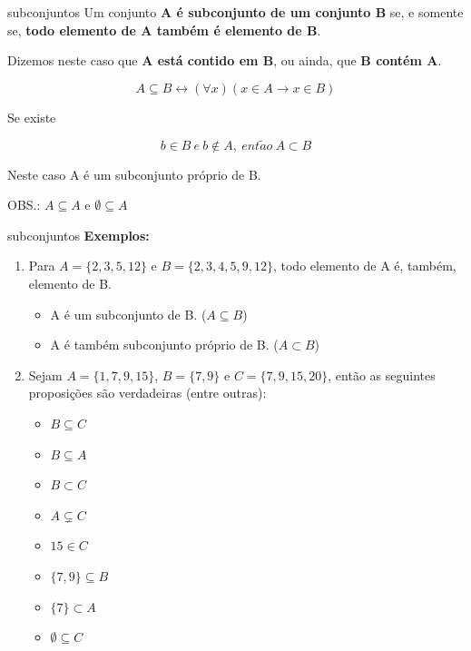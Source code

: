 \documentclass[aspectratio=169]{beamer}
\begin{document}
\begin{frame}{subconjuntos}
    Um conjunto \textbf{A é subconjunto de um conjunto B} se, e somente se, \textbf{todo elemento de A também é elemento de B}.

    \vspace{4mm}
    Dizemos neste caso que \textbf{A está contido em B}, ou ainda, que \textbf{B contém A}.

    \[ A \subseteq  B \leftrightarrow (\forall x)(x \in A \rightarrow x \in B )\]

    Se existe

    \[ b \in B ~ e ~ b \notin A, ~ ent\tilde{a}o ~ A \subset B \]

    \vspace{4mm}
    Neste caso A é um subconjunto próprio de B.

    \vspace{4mm} 
    OBS.: $A \subseteq A$ e $ \emptyset \subseteq  A$
\end{frame}


\begin{frame}{subconjuntos}
    \textbf{Exemplos:}
    \vspace{4mm}

    \begin{enumerate}
        \item Para $A=\{2, 3, 5, 12\}$ e $B=\{2, 3, 4, 5, 9, 12\}$, todo elemento de A é, também, elemento de B.
        \begin{itemize}
            \item A é um subconjunto de B. ($A \subseteq B$)
            \item A é também subconjunto próprio de B. ($A \subset B$)
        \end{itemize}

        \item Sejam $A=\{1, 7, 9, 15\}$, $B=\{7, 9\}$ e $C=\{7, 9, 15,20\}$, então as seguintes proposições são verdadeiras (entre outras):
        \begin{multicols}{2}
            \begin{itemize}
                \item $B \subseteq  C$
                \item $B \subseteq  A$
                \item $B \subset  C$
                \item $A \subsetneq  C$
                \item $15 \in C$
                \item $\{7, 9\} \subseteq B$
                \item $\{7\} \subset A$
                \item $ \emptyset \subseteq C$
            \end{itemize}
    \end{multicols}
    \end{enumerate}
    
\end{frame}
\end{document}
